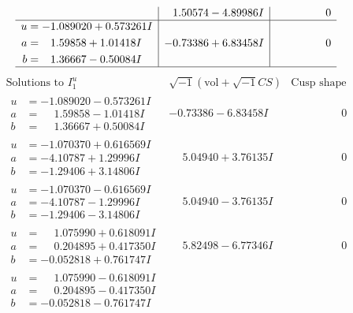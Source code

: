 \documentclass[1p]{elsarticle_modified}
\theoremstyle{definition}
\newcommand{\I}{\sqrt{-1}}
\begin{document}
$$\begin{array}{c|c|c}
 & \phantom{-}1.50574 - 4.89986 I & \phantom{-0.000000 } 0 \\ \hline\begin{aligned}
u &= -1.089020 + 0.573261 I \\
a &= \phantom{-}1.59858 + 1.01418 I \\
b &= \phantom{-}1.36667 - 0.50084 I\end{aligned}
 & -0.73386 + 6.83458 I & \phantom{-0.000000 } 0\\
 \hline 
 \end{array}$$\newpage$$\begin{array}{c|c|c}  
\text{Solutions to }I^u_{1}& \I (\text{vol} + \sqrt{-1}CS) & \text{Cusp shape}\\
 \hline 
\begin{aligned}
u &= -1.089020 - 0.573261 I \\
a &= \phantom{-}1.59858 - 1.01418 I \\
b &= \phantom{-}1.36667 + 0.50084 I\end{aligned}
 & -0.73386 - 6.83458 I & \phantom{-0.000000 } 0 \\ \hline\begin{aligned}
u &= -1.070370 + 0.616569 I \\
a &= -4.10787 + 1.29996 I \\
b &= -1.29406 + 3.14806 I\end{aligned}
 & \phantom{-}5.04940 + 3.76135 I & \phantom{-0.000000 } 0 \\ \hline\begin{aligned}
u &= -1.070370 - 0.616569 I \\
a &= -4.10787 - 1.29996 I \\
b &= -1.29406 - 3.14806 I\end{aligned}
 & \phantom{-}5.04940 - 3.76135 I & \phantom{-0.000000 } 0 \\ \hline\begin{aligned}
u &= \phantom{-}1.075990 + 0.618091 I \\
a &= \phantom{-}0.204895 + 0.417350 I \\
b &= -0.052818 + 0.761747 I\end{aligned}
 & \phantom{-}5.82498 - 6.77346 I & \phantom{-0.000000 } 0 \\ \hline\begin{aligned}
u &= \phantom{-}1.075990 - 0.618091 I \\
a &= \phantom{-}0.204895 - 0.417350 I \\
b &= -0.052818 - 0.761747 I\end{aligned}

\end{array}$$
\end{document}
